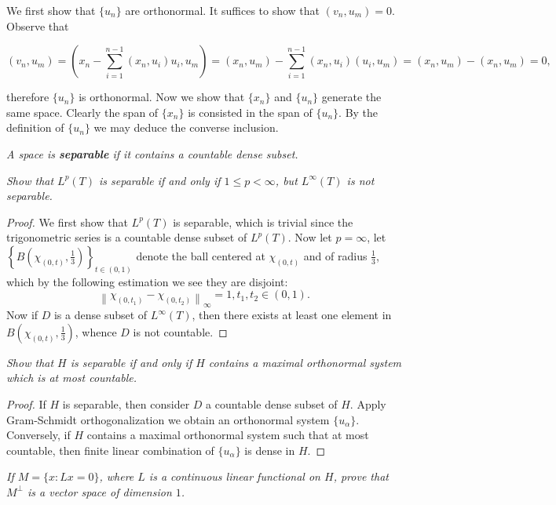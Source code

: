 We first show that $\{u_n\}$ are orthonormal. It suffices to show that $(v_n,u_m)=0$. Observe that 
\begin{small}
$$
\left( v_n,u_m \right) =\left( x_n-\sum_{i=1}^{n-1}{\left( x_n,u_i \right) u_i},u_m \right) =\left( x_n,u_m \right) -\sum_{i=1}^{n-1}{\left( x_n,u_i \right) \left( u_i,u_m \right)}=\left( x_n,u_m \right) -\left( x_n,u_m \right) =0,
$$
\end{small}
therefore $\{u_n\}$ is orthonormal. Now we show that $\{x_n\}$ and $\{u_n\}$ generate the same space. Clearly the span of $\{x_n\}$ is consisted in the span of $\{u_n\}$. By the definition of $\{u_n\}$ we may deduce the converse inclusion.
\begin{note}\em
A space is \textbf{separable} if it contains a countable dense subset.
\end{note}
\begin{problem}\em
Show that $L^p(T)$ is separable if and only if $1\le p<\infty$, but $L^\infty(T)$ is not separable.
\end{problem}
\begin{proof}
We first show that $L^p(T)$ is separable, which is trivial since the trigonometric series is a countable dense subset of $L^p(T)$. Now let $p=\infty$, let $\left\{ B\left( \chi _{\left( 0,t \right)},\frac{1}{3} \right) \right\} _{t\in \left( 0,1 \right)}$ denote the ball centered at $\chi_{(0,t)}$ and of radius $\frac{1}{3}$, which by the following estimation we see they are disjoint: 
$$
\left\| \chi _{\left( 0,t_1 \right)}-\chi _{\left( 0,t_2 \right)} \right\| _{\infty}=1,t_1,t_2\in \left( 0,1 \right) .
$$
Now if $D$ is a dense subset of $L^\infty(T)$, then there exists at least one element in $B\left(\chi_{(0,t)},\frac{1}{3}\right)$, whence $D$ is not countable.
\end{proof}
\begin{problem}\em
Show that $H$ is separable if and only if $H$ contains a maximal orthonormal system which is at most countable.
\end{problem}
\begin{proof}
If $H$ is separable, then consider $D$ a countable dense subset of $H$. Apply Gram-Schmidt orthogonalization we obtain an orthonormal system $\{u_\alpha\}$. Conversely, if $H$ contains a maximal orthonormal system such that at most countable, then finite linear combination of $\{u_\alpha\}$ is dense in $H$.
\end{proof}
\begin{problem}\em
If $M=\{x:Lx=0\}$, where $L$ is a continuous linear functional on $H$, prove that $M^\perp$ is a vector space of dimension $1$.
\end{problem}

